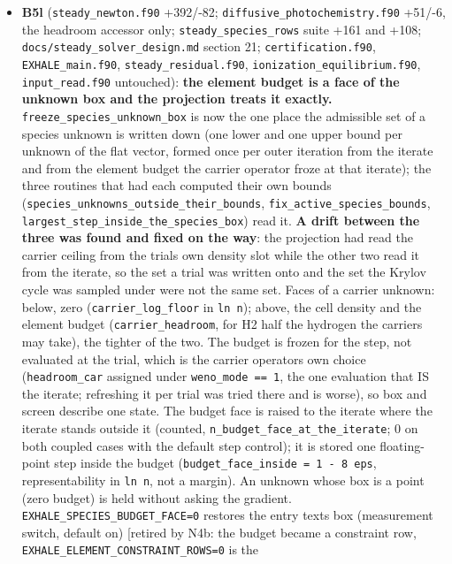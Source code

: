 \documentclass[english,a4paper]{my_memo}
\begin{document}
\begin{itemize}
  as a face of the unknown box.
\item
  \textbf{B5l} (\texttt{steady\_newton.f90} +392/-82; \texttt{diffusive\_photochemistry.f90}
  +51/-6, the headroom accessor only; \texttt{steady\_species\_rows} suite +161 and
  +108; \texttt{docs/steady\_solver\_design.md} section 21; \texttt{certification.f90},
  \texttt{EXHALE\_main.f90}, \texttt{steady\_residual.f90}, \texttt{ionization\_equilibrium.f90},
  \texttt{input\_read.f90} untouched): \textbf{the element budget is a face of the unknown
  box and the projection treats it exactly.} \texttt{freeze\_species\_unknown\_box}
  is now the one place the admissible set of a species unknown is written
  down (one lower and one upper bound per unknown of the flat vector,
  formed once per outer iteration from the iterate and from the element
  budget the carrier operator froze at that iterate); the three routines
  that had each computed their own bounds
  (\texttt{species\_unknowns\_outside\_their\_bounds}, \texttt{fix\_active\_species\_bounds},
  \texttt{largest\_step\_inside\_the\_species\_box}) read it. \textbf{A drift between the
  three was found and fixed on the way}: the projection had read the
  carrier ceiling from the trial\textquotesingle s own density slot while the other two
  read it from the iterate, so the set a trial was written onto and the set
  the Krylov cycle was sampled under were not the same set. Faces of a
  carrier unknown: below, zero (\texttt{carrier\_log\_floor} in \texttt{ln\ n}); above, the
  cell density and the element budget (\texttt{carrier\_headroom}, for H2 half the
  hydrogen the carriers may take), the tighter of the two. The budget is
  frozen for the step, not evaluated at the trial, which is the carrier
  operator\textquotesingle s own choice (\texttt{headroom\_car} assigned under \texttt{weno\_mode\ ==\ 1},
  the one evaluation that IS the iterate; refreshing it per trial was tried
  there and is worse), so box and screen describe one state. The budget
  face is raised to the iterate where the iterate stands outside it
  (counted, \texttt{n\_budget\_face\_at\_the\_iterate}; 0 on both coupled cases with
  the default step control); it is stored one floating-point step inside
  the budget (\texttt{budget\_face\_inside\ =\ 1\ -\ 8\ eps}, representability in \texttt{ln\ n},
  not a margin). An unknown whose box is a point (zero budget) is held
  without asking the gradient. \texttt{EXHALE\_SPECIES\_BUDGET\_FACE=0} restores the
  entry text\textquotesingle s box (measurement switch, default on) {[}retired by N4b: the
  budget became a constraint row, \texttt{EXHALE\_ELEMENT\_CONSTRAINT\_ROWS=0} is the

\end{itemize}
\end{document}
